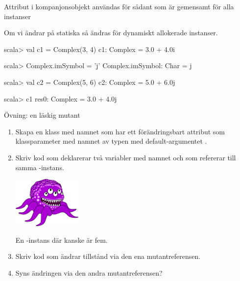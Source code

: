 \begin{Slide}{Attribut i kompanjonsobjekt användas för sådant som är gemensamt för alla instanser}

Om vi ändrar på statiska  så ändras  för  dynamiskt allokerade instanser.
\begin{REPLnonum}
scala> val c1 = Complex(3, 4)
c1: Complex = 3.0 + 4.0i

scala> Complex.imSymbol = 'j'
Complex.imSymbol: Char = j

scala> val c2 = Complex(5, 6)
c2: Complex = 5.0 + 6.0j

scala> c1
res0: Complex = 3.0 + 4.0j
\end{REPLnonum}
\end{Slide}





\begin{Slide}{Övning: en läskig mutant}\SlideFontSmall
\begin{enumerate}
\item Skapa en klass med namnet  som har ett förändringsbart attribut som klassparameter med namnet  av typen  med default-argumentet .
\vspace{0.5em}

\item \begin{minipage}{0.5\textwidth}
Skriv kod som deklarerar två variabler med namnet  och  som refererar till samma -instans.
\end{minipage}
\hfill\begin{minipage}{0.32\textwidth}
\hfill\includegraphics[width=3.4cm]{../img/mutant.png}

En -instans där  kanske är fem.
\vspace{1em}
\end{minipage}

\item Skriv kod som ändrar tillstånd via den ena mutantreferensen.

\item Syns ändringen via den andra mutantreferensen?
\end{enumerate}
\end{Slide}




